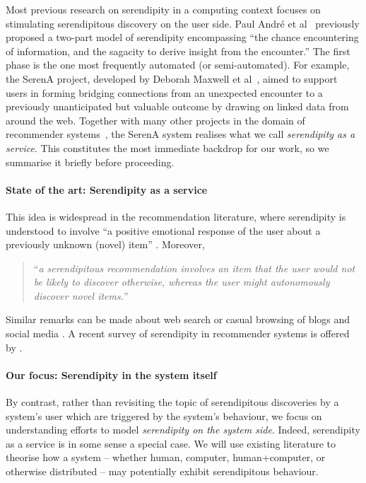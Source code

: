 Most previous research on serendipity in a computing context focuses
on stimulating serendipitous discovery on the user side.  Paul
Andr{\'e} et al~\cite{andre2009discovery} previously proposed a
two-part model of serendipity encompassing ``the chance encountering
of information, and the sagacity to derive insight from the
encounter.''
The first phase is the one most frequently automated (or
semi-auto\-mated).  For example, the {\sf SerenA} project, developed
by Deborah Maxwell et al~\cite{maxwell2012designing}, aimed to
support users in forming bridging connections from an unexpected
encounter to a previously unanticipated but valuable outcome by
drawing on linked data from around the web. Together with many other
projects in the domain of recommender systems~\cite{Zhang2011}, the
{\sf SerenA} system realises what we call \emph{serendipity as a
  service}.  This constitutes the most immediate backdrop for our
work, so we summarise it briefly before proceeding.

\paragraph{State of the art: Serendipity as a service}
This idea is widespread in the recommendation literature, where serendipity is understood to involve ``a positive emotional response of the user about a previously unknown (novel) item''  \cite{Adamopoulos:2014:URS:2699158.2559952}.  Moreover,
\begin{quote}
``\emph{a serendipitous recommendation involves an item that the user would not be likely to discover otherwise, whereas the user might autonomously discover novel items.}'' \cite{Adamopoulos:2014:URS:2699158.2559952}
\end{quote}
Similar remarks can be made about web search or casual browsing of blogs and social media \cite{Andre:2009:XSP:1518701.1519009}.
 A recent survey of serendipity in recommender systems is offered by \citet{kotkov2016survey}. 

\paragraph{Our focus: Serendipity in the system itself}
By contrast, rather than revisiting the topic of serendipitous discoveries by a system's user which are triggered by the system's behaviour, we focus on understanding efforts to model \emph{serendipity on the system side}.  Indeed, serendipity as a service is in some sense a special case.  We will use existing literature to theorise how a system -- whether human, computer, human+computer, or otherwise distributed -- may potentially exhibit serendipitous behaviour.

